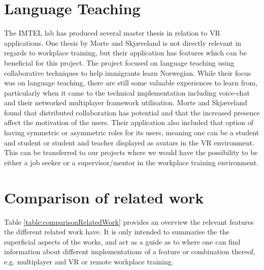 

\section{Language Teaching}
The IMTEL lab has produced several master thesis in relation to VR applications. One thesis by  Morte and Skjæveland \cite{morte2019effects} is not directly relevant in regards to workplace training, but their application has features which can be beneficial for this project. The project focused on language teaching using collaborative techniques to help immigrants learn Norwegian. While their focus was on language teaching, there are still some valuable experiences to learn from, particularly when it came to the technical implementation including voice-chat and their networked multiplayer framework utilisation. Morte and Skjæveland found that distributed collaboration has potential and that the increased presence affect the motivation of the  users. Their application also included that option of having symmetric or asymmetric roles for its users, meaning one can be a student and student or student and teacher displayed as avatars in the VR environment. This can be transferred to our projects where we would have the possibility to be either a job seeker or a supervisor/mentor in the workplace training environment.     

\section{Comparison of related work}
 
Table \ref{table:comparisonRelatedWork} provides an overview the relevant features the different related work have. It is only intended to summarise the the superficial aspects of the works, and act as a guide as to where one can find information about different implementations of a feature or combination thereof, e.g. multiplayer and VR or remote workplace training.


